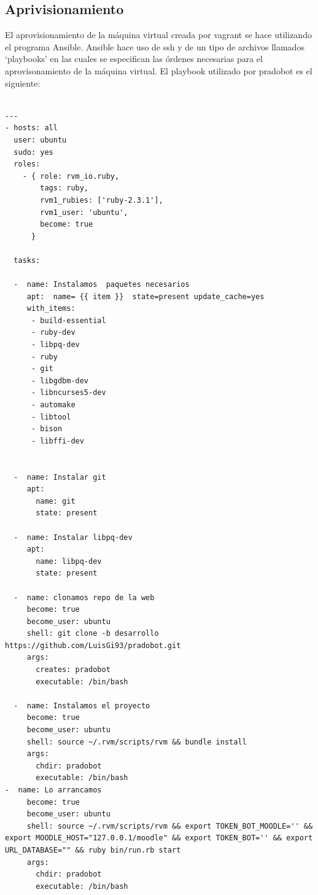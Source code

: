 \subsection{Aprivisionamiento}

El aprovisionamiento de la máquina virtual creada por vagrant se hace utilizando el programa Ansible. Ansible hace uso de ssh y de un tipo de archivos llamados \enquote*{playbooks} en las cuales se especifican las órdenes necesarias para el aprovisonamiento de la máquina virtual. El playbook utilizado por pradobot es el siguiente:
\begin{lstlisting}

---
- hosts: all
  user: ubuntu
  sudo: yes    
  roles:
    - { role: rvm_io.ruby,
        tags: ruby,
        rvm1_rubies: ['ruby-2.3.1'],
        rvm1_user: 'ubuntu',
        become: true
      }
      
  tasks:       

  -  name: Instalamos  paquetes necesarios
     apt:  name= {{ item }}  state=present update_cache=yes
     with_items:
      - build-essential
      - ruby-dev
      - libpq-dev
      - ruby
      - git
      - libgdbm-dev
      - libncurses5-dev
      - automake
      - libtool
      - bison
      - libffi-dev


  -  name: Instalar git
     apt:  
       name: git
       state: present
      
  -  name: Instalar libpq-dev
     apt:  
       name: libpq-dev
       state: present

  -  name: clonamos repo de la web
     become: true  
     become_user: ubuntu
     shell: git clone -b desarrollo https://github.com/LuisGi93/pradobot.git
     args:
       creates: pradobot
       executable: /bin/bash

  -  name: Instalamos el proyecto
     become: true  
     become_user: ubuntu 
     shell: source ~/.rvm/scripts/rvm && bundle install 
     args:
       chdir: pradobot
       executable: /bin/bash
-  name: Lo arrancamos
     become: true  
     become_user: ubuntu
     shell: source ~/.rvm/scripts/rvm && export TOKEN_BOT_MOODLE='' && export MOODLE_HOST="127.0.0.1/moodle" && export TOKEN_BOT='' && export URL_DATABASE="" && ruby bin/run.rb start
     args:
       chdir: pradobot
       executable: /bin/bash
\end{lstlisting}

